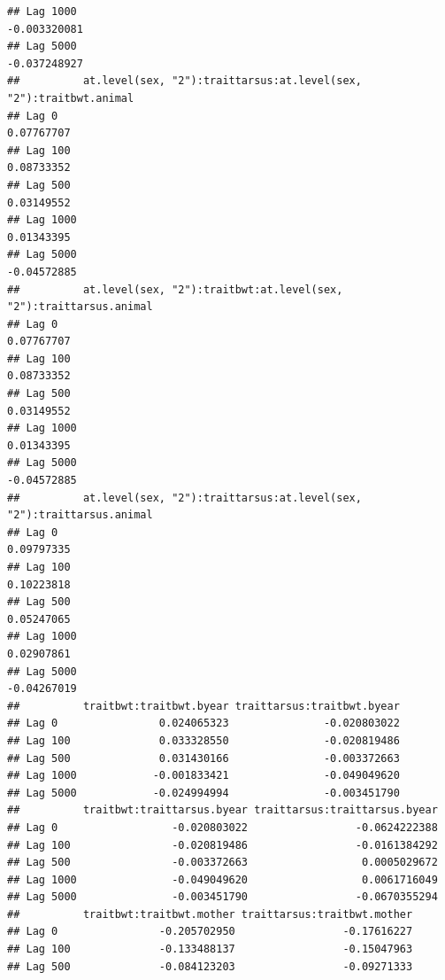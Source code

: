 \documentclass[
  12pt,
]{book}
\begin{document}
\begin{verbatim}
## Lag 1000                                                   -0.003320081
## Lag 5000                                                   -0.037248927
##          at.level(sex, "2"):traittarsus:at.level(sex, "2"):traitbwt.animal
## Lag 0                                                           0.07767707
## Lag 100                                                         0.08733352
## Lag 500                                                         0.03149552
## Lag 1000                                                        0.01343395
## Lag 5000                                                       -0.04572885
##          at.level(sex, "2"):traitbwt:at.level(sex, "2"):traittarsus.animal
## Lag 0                                                           0.07767707
## Lag 100                                                         0.08733352
## Lag 500                                                         0.03149552
## Lag 1000                                                        0.01343395
## Lag 5000                                                       -0.04572885
##          at.level(sex, "2"):traittarsus:at.level(sex, "2"):traittarsus.animal
## Lag 0                                                              0.09797335
## Lag 100                                                            0.10223818
## Lag 500                                                            0.05247065
## Lag 1000                                                           0.02907861
## Lag 5000                                                          -0.04267019
##          traitbwt:traitbwt.byear traittarsus:traitbwt.byear
## Lag 0                0.024065323               -0.020803022
## Lag 100              0.033328550               -0.020819486
## Lag 500              0.031430166               -0.003372663
## Lag 1000            -0.001833421               -0.049049620
## Lag 5000            -0.024994994               -0.003451790
##          traitbwt:traittarsus.byear traittarsus:traittarsus.byear
## Lag 0                  -0.020803022                 -0.0624222388
## Lag 100                -0.020819486                 -0.0161384292
## Lag 500                -0.003372663                  0.0005029672
## Lag 1000               -0.049049620                  0.0061716049
## Lag 5000               -0.003451790                 -0.0670355294
##          traitbwt:traitbwt.mother traittarsus:traitbwt.mother
## Lag 0                -0.205702950                 -0.17616227
## Lag 100              -0.133488137                 -0.15047963
## Lag 500              -0.084123203                 -0.09271333

\end{verbatim}
\end{document}

